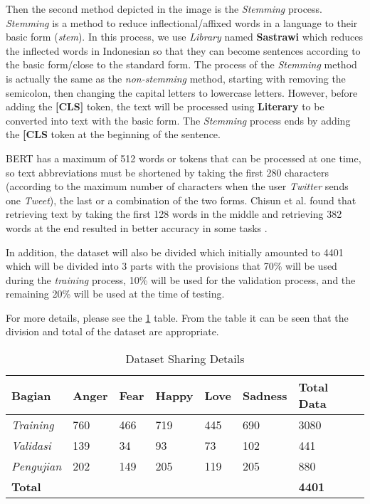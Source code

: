 Then the second method depicted in the image is the \textit{Stemming} process. \textit{Stemming} is a method to reduce inflectional/affixed words in a language to their basic form (\textit{stem}). In this process, we use \textit{Library} named \textbf{Sastrawi} which reduces the inflected words in Indonesian so that they can become sentences according to the basic form/close to the standard form. The process of the \textit{Stemming} method is actually the same as the \textit{non-stemming} method, starting with removing the semicolon, then changing the capital letters to lowercase letters. However, before adding the \textbf{[CLS]} token, the text will be processed using \textbf{Literary} to be converted into text with the basic form. The \textit{Stemming} process ends by adding the \textbf{[CLS} token at the beginning of the sentence.

BERT has a maximum of 512 words or tokens that can be processed at one time, so text abbreviations must be shortened by taking the first 280 characters (according to the maximum number of characters when the user \textit{Twitter} sends one \textit{ Tweet}), the last or a combination of the two forms. Chisun et al. found that retrieving text by taking the first 128 words in the middle and retrieving 382 words at the end resulted in better accuracy in some tasks \cite{sun2019fine}.

In addition, the dataset will also be divided which initially amounted to 4401 which will be divided into 3 parts with the provisions that 70\% will be used during the \textit{training} process, 10\% will be used for the validation process, and the remaining 20\% will be used at the time of testing.

For more details, please see the \ref{tab:dataset_section} table. From the table it can be seen that the division and total of the dataset are appropriate.

\begin{table}[]
    \caption{Dataset Sharing Details}
    \label{tab:dataset_section}
    \centering
    \begin{tabular}{ | l | l | l | l | l | l | l | }
        \hline
        \textbf{Bagian}                      & \textbf{Anger} & \textbf{Fear} & \textbf{Happy} & \textbf{Love} & \textbf{Sadness} & \textbf{Total Data} \\ \hline
        \textit{Training}                    & 760            & 466            & 719          & 445              & 690                  & 3080        \\ \hline
        \textit{Validasi}                    & 139            &  34           & 93          & 73              &   102               &  441       \\ \hline
        \textit{Pengujian}                    & 202            & 149            & 205          & 119               & 205                  & 880        \\ \hline
        \multicolumn{6}{|l|}{\textbf{Total}} & \textbf{4401}                                         \\ \hline
    \end{tabular}
\end{table}


